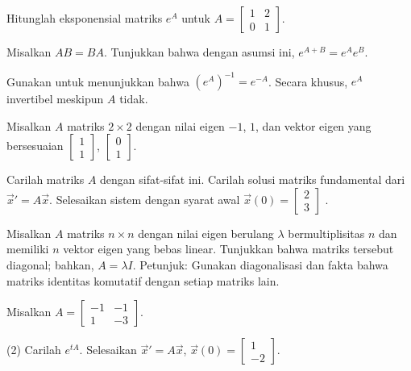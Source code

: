 \begin{exercise}
Hitunglah eksponensial matriks $e^A$ untuk
$A = \left[ \begin{smallmatrix} 1 & 2 \\ 0 & 1 \end{smallmatrix} \right]$.
\end{exercise}

\begin{exercise}[menantang] \label{matexp:explawex}
Misalkan $AB = BA$.  Tunjukkan bahwa dengan asumsi ini, $e^{A+B} = e^A e^B$.
\end{exercise}

\begin{exercise} \label{matexp:expinvex}
Gunakan 
untuk menunjukkan bahwa ${(e^{A})}^{-1} = e^{-A}$.  Secara khusus,
$e^A$ invertibel meskipun $A$ tidak.
\end{exercise}

\begin{exercise}
Misalkan $A$ matriks $2 \times 2$ dengan nilai eigen $-1$, $1$, dan
vektor eigen yang bersesuaian
$\left[ \begin{smallmatrix}
1 \\
1
\end{smallmatrix} \right]$,
$\left[ \begin{smallmatrix}
0 \\
1
\end{smallmatrix} \right]$.
\begin{tasks}
\task Carilah matriks $A$ dengan sifat-sifat ini.
\task Carilah solusi matriks fundamental dari ${\vec{x}}' = A \vec{x}$.
\task Selesaikan sistem dengan syarat awal $\vec{x}(0) =
\left[ \begin{smallmatrix}
2 \\
3
\end{smallmatrix} \right]$ .
\end{tasks}
\end{exercise}

\begin{exercise}
Misalkan $A$ matriks $n \times n$ dengan nilai eigen berulang
$\lambda$ bermultiplisitas $n$ dan memiliki
$n$ vektor eigen yang bebas linear.  Tunjukkan bahwa
matriks tersebut diagonal; bahkan, $A = \lambda I$.  Petunjuk: Gunakan
diagonalisasi dan fakta bahwa matriks identitas komutatif dengan setiap
matriks lain.
\end{exercise}

\begin{exercise}
Misalkan $A = \left[ \begin{smallmatrix}
-1 & -1 \\
1 & -3
\end{smallmatrix} \right]$.
\begin{tasks}(2)
\task Carilah $e^{tA}$.
\task Selesaikan
${\vec{x}}' = A \vec{x}$, $\vec{x}(0) =
\left[ \begin{smallmatrix}
1 \\
-2
\end{smallmatrix} \right]$.
\end{tasks}
\end{exercise}

